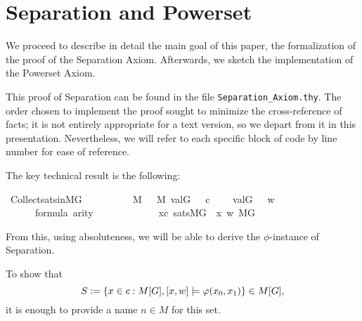 \section{Separation and Powerset}
\label{sec:proof-separation}
We proceed to describe in detail the main goal of this paper, the formalization
of the proof of the Separation Axiom. Afterwards, we sketch  the
implementation of the Powerset Axiom.

This proof of Separation can be found in the file
\verb|Separation_Axiom.thy|. The order chosen to
implement
the proof sought to minimize the cross-reference of facts;  it is
not entirely appropriate for a text version, so we depart from it in
this presentation. Nevertheless, we will refer to each specific block
of code by line number for ease of reference.

The key technical result is the following:
\begin{isabelle}
  \isamarkupfalse%
  \ Collect{\isacharunderscore}sats{\isacharunderscore}in{\isacharunderscore}MG\ {\isacharcolon}\isanewline
  \ \ \isanewline
  \ \ \ \ {\isachardoublequoteopen}{\isasympi}\ {\isasymin}\ M{\isachardoublequoteclose}\ {\isachardoublequoteopen}{\isasymsigma}\ {\isasymin}\ M{\isachardoublequoteclose}\ {\isachardoublequoteopen}val{\isacharparenleft}G{\isacharcomma}\ {\isasympi}{\isacharparenright}\ {\isacharequal}\ c{\isachardoublequoteclose}\isanewline
  \ \ \ \  {\isachardoublequoteopen}val{\isacharparenleft}G{\isacharcomma}\ {\isasymsigma}{\isacharparenright}\ {\isacharequal}\ w{\isachardoublequoteclose}\isanewline
  \ \ \ \ {\isachardoublequoteopen}{\isasymphi}\ {\isasymin}\ formula{\isachardoublequoteclose}\ {\isachardoublequoteopen}arity{\isacharparenleft}{\isasymphi}{\isacharparenright}\ {\isasymle}\ {}{\isachardoublequoteclose}\isanewline
  \ \ \ \ \ \ \isanewline
  \ \ \ \ {\isachardoublequoteopen}{\isacharbraceleft}x{\isasymin}c{\isachardot}\ sats{\isacharparenleft}M{\isacharbrackleft}G{\isacharbrackright}{\isacharcomma}\ {\isasymphi}{\isacharcomma}\ {\isacharbrackleft}x{\isacharcomma}\ w{\isacharbrackright}{\isacharparenright}{\isacharbraceright}{\isasymin}\ M{\isacharbrackleft}G{\isacharbrackright}{\isachardoublequoteclose}
\end{isabelle}
%
From this, using absoluteness, we will be able to derive the
$\phi$-instance of Separation. 

To show that   
\[
S\mathrel{\mathop:}=\{x\in c : M[G],[x,w]\models \varphi(x_0,x_1)\} \in M[G],
\]
it is enough to provide a name $n\in M$ for this set.
 
